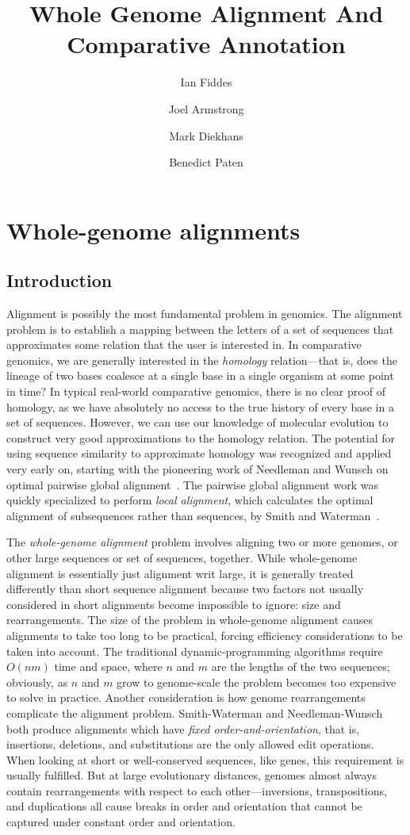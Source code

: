 \documentclass[fleqn,10pt]{wlscirep}
\title{Whole Genome Alignment And Comparative Annotation}
\author[1,+]{Ian Fiddes}
\author[1,+]{Joel Armstrong}
\author[1,]{Mark Diekhans}
\author[1,*]{Benedict Paten}
\affil[1]{UCSC}
\affil[*]{corresponding.author@email.example}
\affil[+]{these authors contributed equally to this work}
\begin{document}
\flushbottom
\maketitle

\thispagestyle{empty}

\section{Whole-genome alignments}
\subsection{Introduction}
Alignment is possibly the most fundamental problem in genomics.
The alignment problem is to establish a mapping between the letters of a set of sequences that approximates some relation that the user is interested in.
In comparative genomics, we are generally interested in the \emph{homology} relation---that is, does the lineage of two bases coalesce at a single base in a single organism at some point in time?
In typical real-world comparative genomics, there is no clear proof of homology, as we have absolutely no access to the true history of every base in a set of sequences.
However, we can use our knowledge of molecular evolution to construct very good approximations to the homology relation.
The potential for using sequence similarity to approximate homology was recognized and applied very early on, starting with the pioneering work of Needleman and Wunsch on optimal pairwise global alignment~\cite{Needleman1970443}.
The pairwise global alignment work was quickly specialized to perform \emph{local alignment}, which calculates the optimal alignment of subsequences rather than sequences, by Smith and Waterman~\cite{Smith1981}.

The \emph{whole-genome alignment} problem involves aligning two or more genomes, or other large sequences or set of sequences, together.
While whole-genome alignment is essentially just alignment writ large, it is generally treated differently than short sequence alignment because two factors not usually considered in short alignments become impossible to ignore: size and rearrangements.
The size of the problem in whole-genome alignment causes alignments to take too long to be practical, forcing efficiency considerations to be taken into account.
The traditional dynamic-programming algorithms require $O(nm)$ time and space, where $n$ and $m$ are the lengths of the two sequences; obviously, as $n$ and $m$ grow to genome-scale the problem becomes too expensive to solve in practice.
Another consideration is how genome rearrangements complicate the alignment problem.
Smith-Waterman and Needleman-Wunsch both produce alignments which have \emph{fixed order-and-orientation}, that is, insertions, deletions, and substitutions are the only allowed edit operations.
When looking at short or well-conserved sequences, like genes, this requirement is usually fulfilled.
But at large evolutionary distances, genomes almost always contain rearrangements with respect to each other---inversions, transpositions, and duplications all cause breaks in order and orientation that cannot be captured under constant order and orientation.
\end{document}
